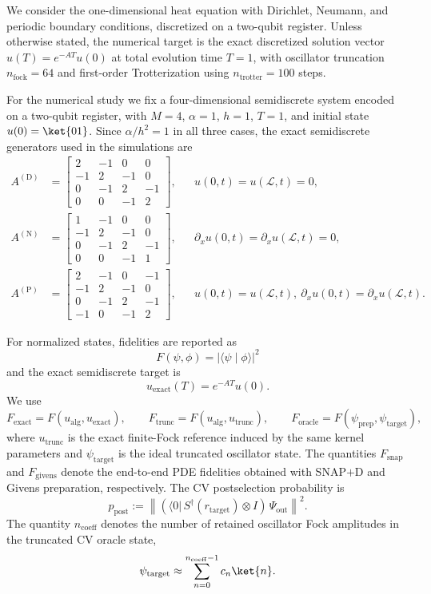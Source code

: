 
We consider the one-dimensional heat equation with Dirichlet, Neumann, and periodic boundary conditions, discretized on a two-qubit register. Unless otherwise stated, the numerical target is the exact discretized solution vector $u(T)=e^{-AT}u(0)$ at total evolution time $T=1$, with oscillator truncation $n_{\mathrm{fock}}=64$ and first-order Trotterization using $n_{\mathrm{trotter}}=100$ steps.

For the numerical study we fix a four-dimensional semidiscrete system encoded on a two-qubit register, with $M=4$, $\alpha=1$, $h=1$, $T=1$, and initial state $u(0)=\ket{01}$. Since $\alpha/h^2=1$ in all three cases, the exact semidiscrete generators used in the simulations are
{\small
\[
\begin{aligned}
A^{(\mathrm D)}&=
\begin{bmatrix}
2&-1&0&0\\
-1&2&-1&0\\
0&-1&2&-1\\
0&0&-1&2
\end{bmatrix},
&&u(0,t)=u(\mathcal L,t)=0,\\[0.5em]
A^{(\mathrm N)}&=
\begin{bmatrix}
1&-1&0&0\\
-1&2&-1&0\\
0&-1&2&-1\\
0&0&-1&1
\end{bmatrix},
&&\partial_x u(0,t)=\partial_x u(\mathcal L,t)=0,\\[0.5em]
A^{(\mathrm P)}&=
\begin{bmatrix}
2&-1&0&-1\\
-1&2&-1&0\\
0&-1&2&-1\\
-1&0&-1&2
\end{bmatrix},
&&u(0,t)=u(\mathcal L,t),\ \partial_x u(0,t)=\partial_x u(\mathcal L,t).
\end{aligned}
\]
}

For normalized states, fidelities are reported as
\[
F(\psi,\phi)=|\langle \psi \mid \phi\rangle|^2
\]
and the exact semidiscrete target is
\[
u_{\mathrm{exact}}(T)=e^{-AT}u(0).
\]
We use
\[
F_{\mathrm{exact}}=F(u_{\mathrm{alg}},u_{\mathrm{exact}}),\qquad
F_{\mathrm{trunc}}=F(u_{\mathrm{alg}},u_{\mathrm{trunc}}),\qquad
F_{\mathrm{oracle}}=F(\psi_{\mathrm{prep}},\psi_{\mathrm{target}}),
\]
where $u_{\mathrm{trunc}}$ is the exact finite-Fock reference induced by the same kernel parameters and $\psi_{\mathrm{target}}$ is the ideal truncated oscillator state. The quantities $F_{\mathrm{snap}}$ and $F_{\mathrm{givens}}$ denote the end-to-end PDE fidelities obtained with SNAP$+$D and Givens preparation, respectively. The CV postselection probability is
\[
p_{\mathrm{post}}
 :=
\left\|
(\langle 0|\,S^\dagger(r_{\mathrm{target}})\otimes I)\,\Psi_{\mathrm{out}}
\right\|^2 .
\]
The quantity $n_{\mathrm{coeff}}$ denotes the number of retained oscillator Fock amplitudes in the truncated CV oracle state,
\[
\psi_{\mathrm{target}} \approx \sum_{n=0}^{n_{\mathrm{coeff}}-1} c_n \ket{n}.
\]


